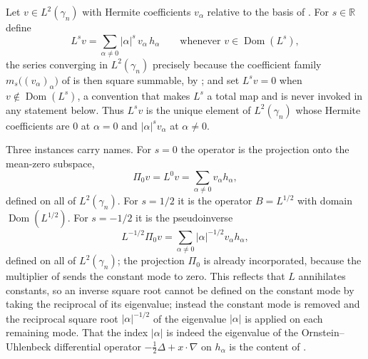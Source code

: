 \begin{definition}
Let $v \in L^2(\gamma_n)$ with Hermite coefficients $v_\alpha$ relative to the
basis of .  For $s \in \mathbb{R}$ define
\[
  L^s v = \sum_{\alpha \neq 0} |\alpha|^{s}\, v_\alpha\, h_\alpha
  \qquad\text{whenever } v \in \operatorname{Dom}(L^s),
\]
the series converging in $L^2(\gamma_n)$ precisely because the coefficient family
$m_s\bigl((v_\alpha)_\alpha\bigr)$ of  is then square
summable, by ; and set $L^s v = 0$ when
$v \notin \operatorname{Dom}(L^s)$, a convention that makes $L^s$ a total map and is
never invoked in any statement below.  Thus $L^s v$ is the unique element of
$L^2(\gamma_n)$ whose Hermite coefficients are $0$ at $\alpha = 0$ and
$|\alpha|^s v_\alpha$ at $\alpha \neq 0$.

Three instances carry names.  For $s = 0$ the operator is the projection onto the
mean-zero subspace,
\[
  \Pi_0 v = L^0 v = \sum_{\alpha \neq 0} v_\alpha h_\alpha ,
\]
defined on all of $L^2(\gamma_n)$.  For $s = 1/2$ it is the operator
$B = L^{1/2}$ with domain $\operatorname{Dom}(L^{1/2})$.  For $s = -1/2$ it is the
pseudoinverse
\[
  L^{-1/2}\Pi_0 v = \sum_{\alpha \neq 0} |\alpha|^{-1/2} v_\alpha h_\alpha ,
\]
defined on all of $L^2(\gamma_n)$; the projection $\Pi_0$ is already incorporated,
because the multiplier of  sends the constant mode to zero.
This reflects that $L$ annihilates constants, so an inverse square root cannot be
defined on the constant mode by taking the reciprocal of its eigenvalue; instead
the constant mode is removed and the reciprocal square root $|\alpha|^{-1/2}$ of
the eigenvalue $|\alpha|$ is applied on each remaining mode.  That the index
$|\alpha|$ is indeed the eigenvalue of the Ornstein--Uhlenbeck differential
operator $-\tfrac12\Delta + x\cdot\nabla$ on $h_\alpha$ is the content of
.
\end{definition}
